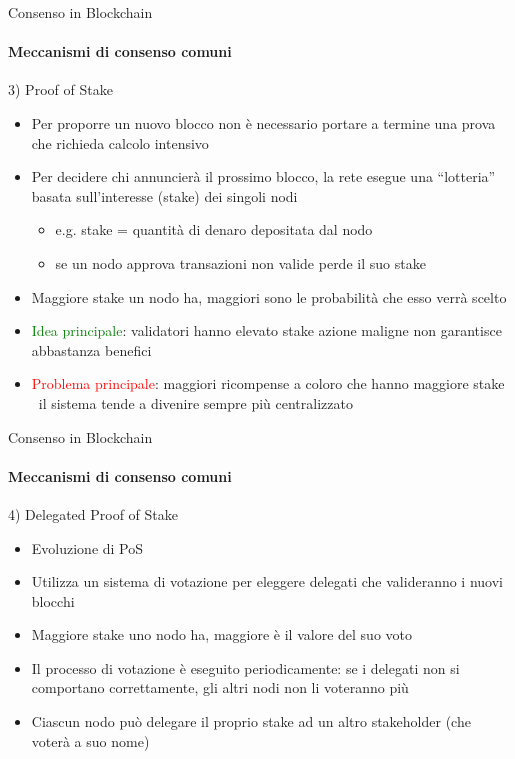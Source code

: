\documentclass{beamer}
\newcommand\red[1]{\textcolor{red}{#1}}
\begin{document}
  \begin{frame}{Consenso in Blockchain}
    \framesubtitle{Meccanismi di consenso comuni}
    \begin{block}{3) Proof of Stake}
      \begin{itemize}
        \item Per proporre un nuovo blocco non è necessario portare a termine una prova che richieda calcolo intensivo
        \item Per decidere chi annuncierà il prossimo blocco, la rete esegue una ``lotteria'' basata sull'interesse (stake) dei singoli nodi
        \begin{itemize}
            \item[\MVRightarrow] e.g. stake = quantità di denaro depositata dal nodo
            \item[\MVRightarrow] se un nodo approva transazioni non valide perde il suo stake
        \end{itemize}
        \item Maggiore stake un nodo ha, maggiori sono le probabilità che esso verrà scelto 
        \item \textcolor{green}{Idea principale}: validatori hanno elevato stake \MVRightarrow azione maligne non garantisce abbastanza benefici \pause
        \item \red{Problema principale}: maggiori ricompense a coloro che hanno maggiore stake \MVRightarrow\ il sistema tende a divenire sempre più centralizzato
      \end{itemize}
    \end{block}
  \end{frame}





  \begin{frame}{Consenso in Blockchain}
    \framesubtitle{Meccanismi di consenso comuni}
    \begin{block}{4) Delegated Proof of Stake}
      \begin{itemize}
        \item Evoluzione di PoS
        \item Utilizza un sistema di votazione per eleggere delegati che valideranno i nuovi blocchi 
        \item Maggiore stake uno nodo ha, maggiore è il valore del suo voto 
        \item Il processo di votazione è eseguito periodicamente: se i delegati non si comportano correttamente, gli altri nodi non li voteranno più
        \item Ciascun nodo può delegare il proprio stake ad un altro stakeholder (che voterà a suo nome) 
        \end{itemize}
    \end{block}
  \end{frame}
\end{document}
